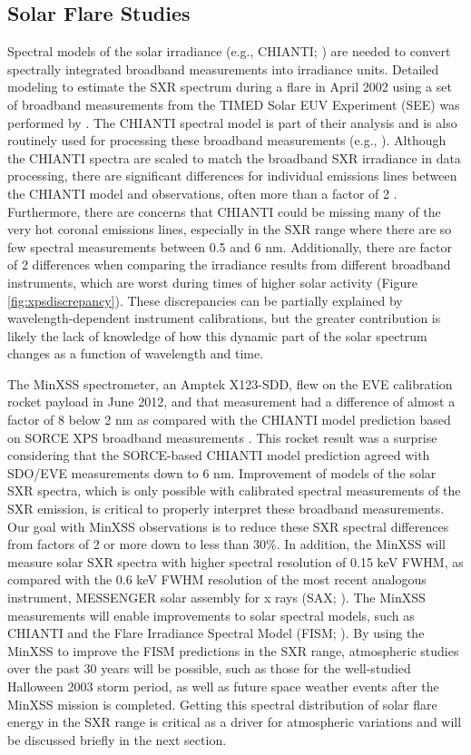 \subsection{Solar Flare Studies}
Spectral models of the solar irradiance (e.g., CHIANTI; \citealt{Dere1997, Landi2006}) are needed to convert spectrally integrated broadband measurements into irradiance units. Detailed modeling to estimate the SXR spectrum during a flare in April 2002 using a set of broadband measurements from the TIMED Solar EUV Experiment (SEE) was performed by \citet{Rodgers2006}. The CHIANTI spectral model is part of their analysis and is also routinely used for processing these broadband measurements (e.g., \citealt{Woods2008}). Although the CHIANTI spectra are scaled to match the broadband SXR irradiance in data processing, there are significant differences for individual emissions lines between the CHIANTI model and observations, often more than a factor of 2 \citep{Woods2009, Caspi2010}. Furthermore, there are concerns that CHIANTI could be missing many of the very hot coronal emissions lines, especially in the SXR range where there are so few spectral measurements between 0.5 and 6 nm. Additionally, there are factor of 2 differences when comparing the irradiance results from different broadband instruments, which are worst during times of higher solar activity (Figure \ref{fig:xpsdiscrepancy}). These discrepancies can be partially explained by wavelength-dependent instrument calibrations, but the greater contribution is likely the lack of knowledge of how this dynamic part of the solar spectrum changes as a function of wavelength and time.

The MinXSS spectrometer, an Amptek X123-SDD, flew on the EVE calibration rocket payload in June 2012, and that measurement had a difference of almost a factor of 8 below 2 nm as compared with the CHIANTI model prediction based on SORCE XPS broadband measurements \citep{Caspi2015}. This rocket result was a surprise considering that the SORCE-based CHIANTI model prediction agreed with SDO/EVE measurements down to 6 nm. Improvement of models of the solar SXR spectra, which is only possible with calibrated spectral measurements of the SXR emission, is critical to properly interpret these broadband measurements. Our goal with MinXSS observations is to reduce these SXR spectral differences from factors of 2 or more down to less than 30\%. In addition, the MinXSS will measure solar SXR spectra with higher spectral resolution of 0.15 keV FWHM, as compared with the 0.6 keV FWHM resolution of the most recent analogous instrument, MESSENGER solar assembly for x rays (SAX; \citealt{Schlemm2007}). The MinXSS measurements will enable improvements to solar spectral models, such as CHIANTI and the Flare Irradiance Spectral Model (FISM; \citealt{Chamberlin2007, Chamberlin2008}). By using the MinXSS to improve the FISM predictions in the SXR range, atmospheric studies over the past 30 years will be possible, such as those for the well-studied Halloween 2003 storm period, as well as future space weather events after the MinXSS mission is completed. Getting this spectral distribution of solar flare energy in the SXR range is critical as a driver for atmospheric variations and will be discussed briefly in the next section.

